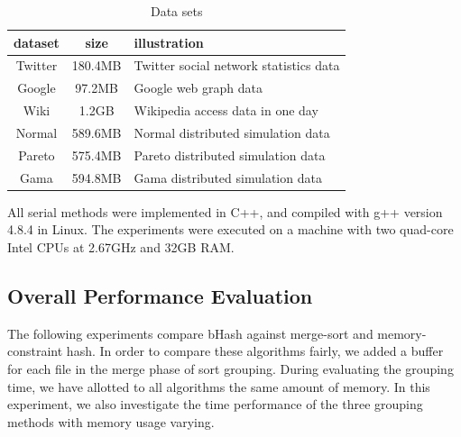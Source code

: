 \begin{table}
  \caption{Data sets}
  \label{tab:commands}
  \begin{tabular}{ccl}
    \toprule
    dataset &size & illustration\\
    \midrule
    Twitter & 180.4MB& Twitter social network statistics data\\
    Google & 97.2MB & Google web graph data\\
    Wiki	&1.2GB	& Wikipedia access data in one day\\
    Normal	&589.6MB& Normal distributed simulation data\\
    Pareto & 575.4MB & Pareto distributed simulation data\\
    Gama & 594.8MB	& Gama distributed simulation data\\
    \bottomrule
  \end{tabular}
\end{table}

All serial methods were implemented in C++, and compiled with g++ version 4.8.4 in Linux. The experiments were executed on a machine with two quad-core Intel CPUs at 2.67GHz and 32GB RAM.



\subsection{Overall Performance Evaluation}

The following experiments compare bHash against merge-sort and memory-constraint hash. In order to compare these algorithms fairly, we added a buffer for each file in the merge phase of sort grouping. During evaluating the grouping time, we have allotted to all algorithms the same amount of memory. In this experiment, we also investigate the time performance of the three grouping methods with memory usage varying.

